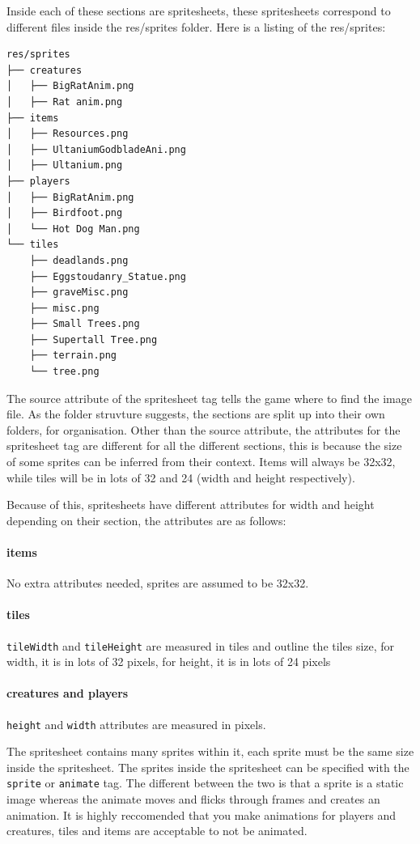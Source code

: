\documentclass{book}
\begin{document}
Inside each of these sections are spritesheets, these spritesheets correspond to different files inside the res/sprites folder. Here is a listing of the res/sprites:

\begin{lstlisting}
res/sprites
├── creatures
│   ├── BigRatAnim.png
│   ├── Rat anim.png
├── items
│   ├── Resources.png
│   ├── UltaniumGodbladeAni.png
│   ├── Ultanium.png
├── players
│   ├── BigRatAnim.png
│   ├── Birdfoot.png
│   └── Hot Dog Man.png
└── tiles
    ├── deadlands.png
    ├── Eggstoudanry_Statue.png
    ├── graveMisc.png
    ├── misc.png
    ├── Small Trees.png
    ├── Supertall Tree.png
    ├── terrain.png
    └── tree.png
\end{lstlisting}

The source attribute of the spritesheet tag tells the game where to find the image file. As the folder struvture suggests, the sections are split up into their own folders, for organisation. Other than the source attribute, the attributes for the spritesheet tag are different for all the different sections, this is because the size of some sprites can be inferred from their context. Items will always be 32x32, while tiles will be in lots of 32 and 24 (width and height respectively). 

Because of this, spritesheets have different attributes for width and height depending on their section, the attributes are as follows:

\paragraph{items} No extra attributes needed, sprites are assumed to be 32x32.
\paragraph{tiles} \texttt{tileWidth} and \texttt{tileHeight} are measured in tiles and outline the tiles size, for width, it is in lots of 32 pixels, for height, it is in lots of 24 pixels
\paragraph{creatures and players} \texttt{height} and \texttt{width} attributes are measured in pixels.

The spritesheet contains many sprites within it, each sprite must be the same size inside the spritesheet. The sprites inside the spritesheet can be specified with the \texttt{sprite} or \texttt{animate} tag. The different between the two is that a sprite is a static image whereas the animate moves and flicks through frames and creates an animation. It is highly reccomended that you make animations for players and creatures, tiles and items are acceptable to not be animated.
\end{document}
